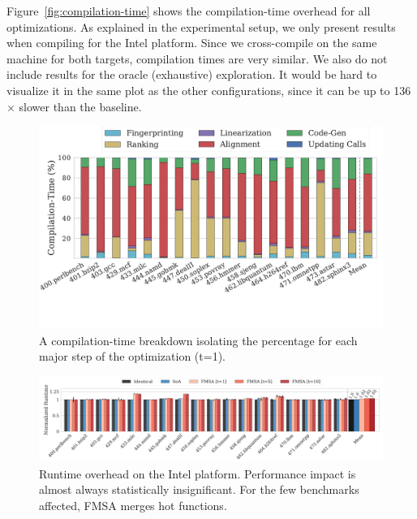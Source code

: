 Figure~\ref{fig:compilation-time} shows the compilation-time overhead for all optimizations. As explained in the experimental setup, we
only present results when compiling for the Intel platform. Since we cross-compile on the same machine for both targets, compilation times
are very similar. We also do not include results for the oracle (exhaustive) exploration. It would be hard to visualize it in the same plot
as the other configurations, since it can be up to 136$\times$ slower than the baseline.

\begin{figure}[t]
  \centering
  \includegraphics[width=1.0\linewidth]{figs/compilation-time-breakdown-sqrd.pdf}
  \vspace{-8.5ex}
  \caption{A compilation-time breakdown isolating the percentage for each major
           step of the optimization (t=1).}%
  \label{fig:compilation-time-breakdown}
\end{figure}

\begin{figure}[t]
  \centering
  \includegraphics[width=\linewidth]{figs/runtime-impact.pdf}
  \vspace{-4ex}
	\caption{Runtime overhead on the Intel platform. Performance impact is almost always statistically insignificant. For the few benchmarks affected, FMSA merges hot functions.}
  \label{fig:runtime-impact}
\end{figure}

